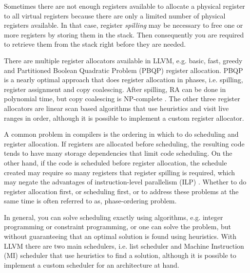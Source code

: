 
Sometimes there are not enough registers available to allocate a physical register to all virtual registers because there are only a limited number of physical registers available. In that case, register \emph{spilling} may be necessary to free one or more registers by storing them in the stack. Then consequently you are required to retrieve them from the stack right before they are needed.

There are multiple register allocators available in LLVM, e.g. basic, fast, greedy and Partitioned Boolean Quadratic Problem (PBQP) register allocation. PBQP is a nearly optimal approach that does register allocation in phases, i.e. spilling, register assignment and copy coalescing. After spilling, RA can be done in polynomial time, but copy coalescing is NP-complete \cite{pbqp}. The other three register allocators are linear scan based algorithms that use heuristics and visit live ranges in order, although it is possible to implement a custom register allocator.


A common problem in compilers is the ordering in which to do scheduling and register allocation. If registers are allocated before scheduling, the resulting code tends to have many storage dependencies that limit code scheduling. On the other hand, if the code is scheduled before register allocation, the schedule created may require so many registers that register spilling is required, which may negate the advantages of instruction-level parallelism (ILP) \cite[Chapter~10.2.4]{dragon_book}. Whether to do register allocation first, or scheduling first, or to address these problems at the same time is often referred to as, phase-ordering problem. 

In general, you can solve scheduling exactly using algorithms, e.g. integer programming or constraint programming, or one can solve the problem, but without guaranteeing that an optimal solution is found using heuristics. With LLVM there are two main schedulers, i.e. list scheduler and Machine Instruction (MI) scheduler that use heuristics to find a solution, although it is possible to implement a custom scheduler for an architecture at hand. 

